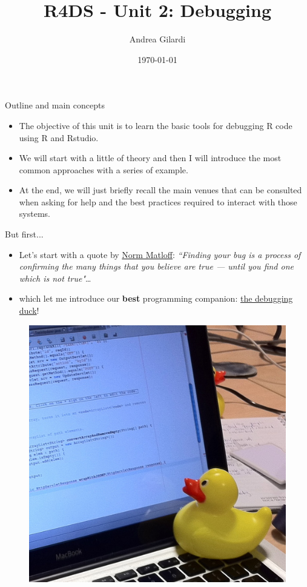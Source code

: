 \documentclass[
hyperref={bookmarks=false},
xcolor={dvipsnames,svgnames*,x11names*}, 
12pt
]{beamer}
\title{R4DS - Unit 2: Debugging}
\author{Andrea Gilardi}
\date{\today}
\begin{document}
\inserttitlepage

\begin{frame}{Outline and main concepts}
\vspace{-0.5cm}
\begin{itemize}
\itemsep 3ex
\item The objective of this unit is to learn the basic tools for debugging R code using R and Rstudio. 
\item We will start with a little of theory and then I will introduce the most common approaches with a series of example. 
\item At the end, we will just briefly recall the main venues that can be consulted when asking for help and the best practices required to interact with those systems.
\end{itemize}
\end{frame}

\begin{frame}{But first...}
\vspace{-0.5cm}
\begin{itemize}
\itemsep 2ex
\item Let's start with a quote by \href{https://heather.cs.ucdavis.edu/matloff.html}{Norm Matloff}: \emph{``Finding your bug is a process of confirming the many things that you believe are true — until you find one which is not true"}\dots
\item which let me introduce our \textbf{best} programming companion: \href{https://en.wikipedia.org/wiki/Rubber_duck_debugging}{the debugging duck}!
\end{itemize}
\begin{figure}
\centering
\includegraphics[width=0.36\linewidth]{figures/rubber-duck-assisting-with-debugging}
\end{figure}
\end{frame}
\end{document}
